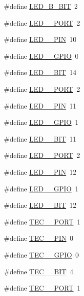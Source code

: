 \begin{DoxyCompactItemize}
\item 
\#define \hyperlink{group__hal_ga50b5b18af7a51f83133cb0ad51380c7d}{L\+E\+D\+\_\+\+B\+\_\+\+B\+IT}~2
\item 
\#define \hyperlink{group__hal_ga2367ab7af33710f8502250e8bd2c1dc0}{L\+E\+D\+\_\+\_\+\+P\+O\+RT}~2
\item 
\#define \hyperlink{group__hal_ga620741f492787e04779bab21e6658113}{L\+E\+D\+\_\+\_\+\+P\+IN}~10
\item 
\#define \hyperlink{group__hal_ga37154c806d85fb9f9158f86bb55e9ee0}{L\+E\+D\+\_\+\_\+\+G\+P\+IO}~0
\item 
\#define \hyperlink{group__hal_ga3fe9954e37c14ff0232f26822e5df035}{L\+E\+D\+\_\+\_\+\+B\+IT}~14
\item 
\#define \hyperlink{group__hal_ga41f8586c0d98e483bba52f73e1a183b2}{L\+E\+D\+\_\+\_\+\+P\+O\+RT}~2
\item 
\#define \hyperlink{group__hal_ga78579f743b58c20ec8d10120d8381148}{L\+E\+D\+\_\+\_\+\+P\+IN}~11
\item 
\#define \hyperlink{group__hal_ga4285bdd58098064c3bab3976a78b26fa}{L\+E\+D\+\_\+\_\+\+G\+P\+IO}~1
\item 
\#define \hyperlink{group__hal_gaef7b45a64de5055d117ed11ec76ee9f5}{L\+E\+D\+\_\+\_\+\+B\+IT}~11
\item 
\#define \hyperlink{group__hal_gaaa65a4a427142f3ecdc5f1fe415d190c}{L\+E\+D\+\_\+\_\+\+P\+O\+RT}~2
\item 
\#define \hyperlink{group__hal_ga5ea98da36d05b171b54c342bcf4a35f7}{L\+E\+D\+\_\+\_\+\+P\+IN}~12
\item 
\#define \hyperlink{group__hal_gadd2d323f8eb544f1ab84762f94e44bd4}{L\+E\+D\+\_\+\_\+\+G\+P\+IO}~1
\item 
\#define \hyperlink{group__hal_gab9b4d582a53ac2329ac4b7527561fa80}{L\+E\+D\+\_\+\_\+\+B\+IT}~12
\item 
\#define \hyperlink{group__hal_ga8646ae3b4a7ad2be7610ff81e3d73c0f}{T\+E\+C\+\_\+\_\+\+P\+O\+RT}~1
\item 
\#define \hyperlink{group__hal_gabbb083565fd13306450dfc5fdcf934c0}{T\+E\+C\+\_\+\_\+\+P\+IN}~0
\item 
\#define \hyperlink{group__hal_ga8731b2048404c4c819291bebfc6a1e6a}{T\+E\+C\+\_\+\_\+\+G\+P\+IO}~0
\item 
\#define \hyperlink{group__hal_ga0f27cf5eeffd9d5f04a6a4c57bbdbae7}{T\+E\+C\+\_\+\_\+\+B\+IT}~4
\item 
\#define \hyperlink{group__hal_ga6dd94a0728943a6bb0706bae78aa529f}{T\+E\+C\+\_\+\_\+\+P\+O\+RT}~1

\end{DoxyCompactItemize}

